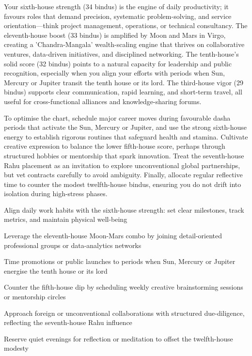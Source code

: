 {\fontsize{9}{13}\selectfont Your sixth-house strength (34 bindus) is the engine of daily productivity; it favours roles that demand precision, systematic problem-solving, and service orientation---think project management, operations, or technical consultancy. The eleventh-house boost (33 bindus) is amplified by Moon and Mars in Virgo, creating a 'Chandra-Mangala' wealth-scaling engine that thrives on collaborative ventures, data-driven initiatives, and disciplined networking. The tenth-house's solid score (32 bindus) points to a natural capacity for leadership and public recognition, especially when you align your efforts with periods when Sun, Mercury or Jupiter transit the tenth house or its lord. The third-house vigor (29 bindus) supports clear communication, rapid learning, and short-term travel, all useful for cross-functional alliances and knowledge-sharing forums.}\par\vspace{1.8mm}

{\fontsize{9}{13}\selectfont To optimise the chart, schedule major career moves during favourable dasha periods that activate the Sun, Mercury or Jupiter, and use the strong sixth-house energy to establish rigorous routines that safeguard health and stamina. Cultivate creative expression to balance the lower fifth-house score, perhaps through structured hobbies or mentorship that spark innovation. Treat the seventh-house Rahu placement as an invitation to explore unconventional global partnerships, but vet contracts carefully to avoid ambiguity. Finally, allocate regular reflective time to counter the modest twelfth-house bindus, ensuring you do not drift into isolation during high-stress phases.}\par\vspace{1.8mm}

\begin{diamondlist}
  \item {\fontsize{8.5}{12}\selectfont Align daily work habits with the sixth-house strength: set clear milestones, track metrics, and maintain physical well-being}
  \item {\fontsize{8.5}{12}\selectfont Leverage the eleventh-house Moon-Mars combo by joining detail-oriented professional groups or data-analytics networks}
  \item {\fontsize{8.5}{12}\selectfont Time promotions or public launches to periods when Sun, Mercury or Jupiter energise the tenth house or its lord}
  \item {\fontsize{8.5}{12}\selectfont Counter the fifth-house dip by scheduling weekly creative brainstorming sessions or mentorship circles}
  \item {\fontsize{8.5}{12}\selectfont Approach foreign or unconventional collaborations with structured due-diligence, reflecting the seventh-house Rahu influence}
  \item {\fontsize{8.5}{12}\selectfont Reserve quiet evenings for reflection or meditation to offset the twelfth-house modesty}
\end{diamondlist}

